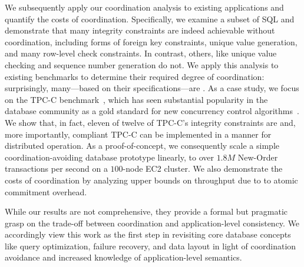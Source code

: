 
We subsequently apply our \iconfluence coordination analysis to
existing applications and quantify the costs of
coordination. Specifically, we examine a subset of SQL and demonstrate
that many integrity constraints are indeed achievable without
coordination, including forms of foreign key constraints, unique value
generation, and many row-level check constraints. In contrast, others,
like unique value checking and sequence number generation do not. We
apply this analysis to existing benchmarks to determine their required
degree of coordination: surprisingly, many---based on their
specifications---are \cfree. As a case study, we focus on the TPC-C
benchmark~\cite{tpcc}, which has seen substantial popularity in the
database community as a gold standard for new concurrency control
algorithms~\cite{abadi-vll,jones-dtxn,schism,calvin,hstore}. We show
that, in fact, eleven of twelve of TPC-C's integrity constraints are
\iconfluent and, more importantly, compliant TPC-C can be implemented
in a \cfree manner for distributed operation. As a proof-of-concept,
we consequently scale a simple coordination-avoiding database
prototype linearly, to over $1.8M$ New-Order transactions per second
on a $100$-node EC2 cluster. We also demonstrate the costs of
coordination by analyzing upper bounds on throughput due to to atomic
commitment overhead.

While our results are not comprehensive, they provide a formal but
pragmatic grasp on the trade-off between coordination and
application-level consistency. We accordingly view this work as the
first step in revisiting core database concepts like query
optimization, failure recovery, and data layout in light of
coordination avoidance and increased knowledge of application-level
semantics.


